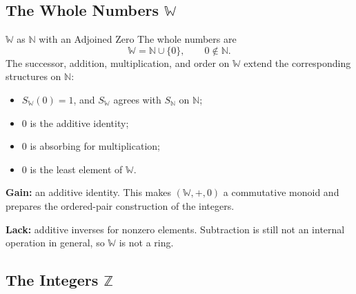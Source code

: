 \subsection*{The Whole Numbers $\mathbb{W}$}

\begin{axiombox}{$\mathbb{W}$ as $\mathbb{N}$ with an Adjoined Zero}
The whole numbers are
\[
\mathbb{W}=\mathbb{N}\cup\{0\},
\qquad 0\notin\mathbb{N}.
\]
The successor, addition, multiplication, and order on $\mathbb{W}$ extend the
corresponding structures on $\mathbb{N}$:
\begin{itemize}
  \item $S_{\mathbb{W}}(0)=1$, and $S_{\mathbb{W}}$ agrees with
        $S_{\mathbb{N}}$ on $\mathbb{N}$;
  \item $0$ is the additive identity;
  \item $0$ is absorbing for multiplication;
  \item $0$ is the least element of $\mathbb{W}$.
\end{itemize}
\end{axiombox}

\begin{remark*}
\textbf{Gain:} an additive identity. This makes
$(\mathbb{W},+,0)$ a commutative monoid and prepares the ordered-pair
construction of the integers.

\textbf{Lack:} additive inverses for nonzero elements. Subtraction is still
not an internal operation in general, so $\mathbb{W}$ is not a ring.
\end{remark*}

\subsection*{The Integers $\mathbb{Z}$}

